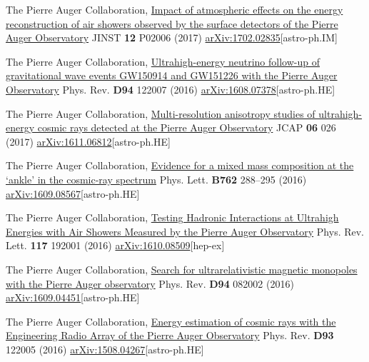\begin{etaremune}
\item {}The Pierre Auger Collaboration, \href{https://doi.org/10.1088/1748-0221/12/02/P02006}{{Impact of atmospheric effects on the energy reconstruction of air showers observed by the surface detectors of the Pierre Auger Observatory}} JINST {\bf 12} P02006 (2017) \href{http://arxiv.org/abs/1702.02835}{arXiv:1702.02835}[astro-ph.IM]

\item {}The Pierre Auger Collaboration, \href{https://doi.org/10.1103/PhysRevD.94.122007}{{Ultrahigh-energy neutrino follow-up of gravitational wave events GW150914 and GW151226 with the Pierre Auger Observatory}} Phys. Rev. {\bf D94} 122007 (2016) \href{http://arxiv.org/abs/1608.07378}{arXiv:1608.07378}[astro-ph.HE]

\item {}The Pierre Auger Collaboration, \href{https://doi.org/10.1088/1475-7516/2017/06/026}{{Multi-resolution anisotropy studies of ultrahigh-energy cosmic rays detected at the Pierre Auger Observatory}} JCAP {\bf 06} 026 (2017) \href{http://arxiv.org/abs/1611.06812}{arXiv:1611.06812}[astro-ph.HE]

\item {}The Pierre Auger Collaboration, \href{http://dx.doi.org/10.1016/j.physletb.2016.09.039}{{Evidence for a mixed mass composition at the ‘ankle’ in the cosmic-ray spectrum}} Phys. Lett. {\bf B762} 288--295 (2016) \href{http://arxiv.org/abs/1609.08567}{arXiv:1609.08567}[astro-ph.HE]

\item {}The Pierre Auger Collaboration, \href{https://doi.org/10.1103/PhysRevLett.117.192001}{{Testing Hadronic Interactions at Ultrahigh Energies with Air Showers Measured by the Pierre Auger Observatory}} Phys. Rev. Lett.  {\bf 117} 192001 (2016) \href{http://arxiv.org/abs/1610.08509}{arXiv:1610.08509}[hep-ex]

\item {}The Pierre Auger Collaboration, \href{https://doi.org/10.1103/PhysRevD.94.082002}{{Search for ultrarelativistic magnetic monopoles with the Pierre Auger observatory}} Phys. Rev. {\bf D94} 082002 (2016) \href{http://arxiv.org/abs/1609.04451}{arXiv:1609.04451}[astro-ph.HE]

\item {}The Pierre Auger Collaboration, \href{https://doi.org/10.1103/PhysRevD.93.122005}{{Energy estimation of cosmic rays with the Engineering Radio Array of the Pierre Auger Observatory}} Phys. Rev. {\bf D93} 122005 (2016) \href{http://arxiv.org/abs/1508.04267}{arXiv:1508.04267}[astro-ph.HE]


\end{etaremune}

